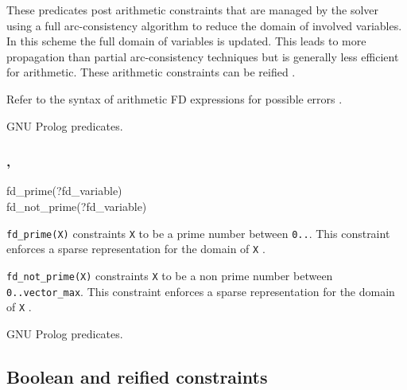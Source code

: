 These predicates post arithmetic constraints that are managed by the solver
using a full arc-consistency algorithm to reduce the domain of involved
variables. In this scheme the full domain of variables is updated. This
leads to more propagation than partial arc-consistency techniques  but is generally less efficient for arithmetic.
These arithmetic constraints can be reified .

\Errors

Refer to the syntax of arithmetic FD expressions for possible errors
.

\Portability

GNU Prolog predicates.

\subsubsection{,
               }

\begin{TemplatesOneCol}
fd\_prime(?fd\_variable)\\
fd\_not\_prime(?fd\_variable)

\end{TemplatesOneCol}

\Description

\texttt{fd\_prime(X)} constraints \texttt{X} to be a prime number between
\texttt{0..}.
This constraint enforces a sparse representation
for the domain of \texttt{X} .

\texttt{fd\_not\_prime(X)} constraints \texttt{X} to be a non prime number
between \texttt{0..vector\_max}. This constraint enforces a sparse
representation for the domain of \texttt{X} .

\begin{PlErrors}


\end{PlErrors}

\Portability

GNU Prolog predicates.

\subsection{Boolean and reified constraints}
\label{Boolean-and-reified-constraints}

